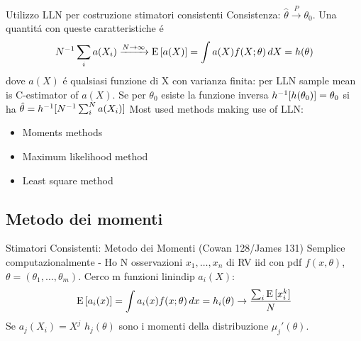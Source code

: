 \documentclass[asd-beamer.tex]{subfiles}%
\begin{document}
\begin{frame}{Utilizzo LLN per costruzione stimatori consistenti}\frameintoc
Consistenza: $\hat{\theta}\xrightarrow{P}\theta_0$. Una quantit\'a con queste caratteristiche \'e
\[{N}^{-1}\sum_ia(X_i)\xrightarrow{N\to\infty}\operatorname{E}{[a(X)]}=\int a(X)f(X;\theta)\,dX=h(\theta)\]
dove $a(X)$ \'e qualsiasi funzione di X con varianza finita: per LLN sample mean is C-estimator of $a(X)$. Se per $\theta_0$ esiste la funzione inversa ${h}^{-1}[h(\theta_0)]=\theta_0$ si ha $\hat{\theta}={h}^{-1}[{N}^{-1}\sum_i^Na(X_i)]$
Most used methods making use of LLN:
\begin{itemize}
\item Moments methods
\item Maximum likelihood method
\item Least square method
\end{itemize}
\end{frame}

\subsection{Metodo dei momenti}

\begin{frame}{Stimatori Consistenti: Metodo dei Momenti (Cowan 128/James 131)}\frameintoc
Semplice computazionalmente - Ho N osservazioni $x_1,\ldots,x_n$ di RV iid con pdf $f(x,\theta)$, $\theta=(\theta_1,\ldots,\theta_m)$. Cerco m funzioni linindip $a_i(X)$:
\[\operatorname{E}{[a_i(x)]}=\int a_i(x)f(x;\theta)\,dx=h_i(\theta)\to\frac{\sum_i\operatorname{E}{[x_i^k]}}{N}\]
Se $a_j(X_i)=X^j$ $h_j(\theta)$ sono i momenti della distribuzione $\mu_j'(\theta)$.
\end{frame}
\end{document}
